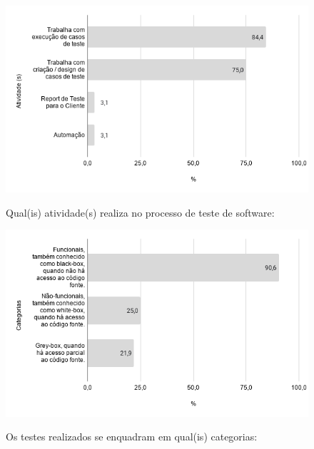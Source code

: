     
        \begin{figure}[!htb]
        \centering
        \includegraphics[width=.80\textwidth]{images/s_atividadesprojeto.png}
        \label{figure:s_atividadesprojeto}
        \caption{Qual(is) atividade(s) realiza no processo de teste de software:}
            \end{figure}   
    
    
        \begin{figure}[!htb]
        \centering
        \includegraphics[width=.80\textwidth]{images/s_categoriastestes.png}
        \label{figure:s_categoriastestes}
        \caption{Os testes realizados se enquadram em qual(is) categorias:}
        \end{figure}       
    
